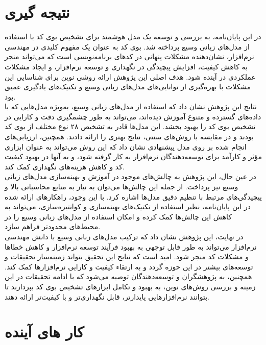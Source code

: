 
\section{نتیجه گیری}
در این پایان‌نامه، به بررسی و توسعه یک مدل هوشمند برای تشخیص بوی کد با استفاده از مدل‌های زبانی وسیع پرداخته شد. بوی کد به عنوان یک مفهوم کلیدی در مهندسی نرم‌افزار، نشان‌دهنده مشکلات پنهانی در کدهای برنامه‌نویسی است که می‌تواند منجر به کاهش کیفیت، افزایش پیچیدگی در نگهداری و توسعه نرم‌افزار، و ایجاد مشکلات عملکردی در آینده شود. هدف اصلی این پژوهش ارائه روشی نوین برای شناسایی این مشکلات با بهره‌گیری از توانایی‌های مدل‌های زبانی وسیع و تکنیک‌های یادگیری عمیق بود.
\\
نتایج این پژوهش نشان داد که استفاده از مدل‌های زبانی وسیع، به‌ویژه مدل‌هایی که با داده‌های گسترده و متنوع آموزش دیده‌اند، می‌تواند به طور چشمگیری دقت و کارایی در تشخیص بوی کد را بهبود بخشد. این مدل‌ها قادر به تشخیص ۲۸ نوع مختلف از بوی کد بودند و در مقایسه با روش‌های سنتی، نتایج بهتری را ارائه دادند. همچنین، ارزیابی‌های انجام شده بر روی مدل پیشنهادی نشان داد که این روش می‌تواند به عنوان ابزاری مؤثر و کارآمد برای توسعه‌دهندگان نرم‌افزار به کار گرفته شود، و به آنها در بهبود کیفیت کد و کاهش هزینه‌های نگهداری کمک کند.
\\
در عین حال، این پژوهش به چالش‌های موجود در آموزش و بهینه‌سازی مدل‌های زبانی وسیع نیز پرداخت. از جمله این چالش‌ها می‌توان به نیاز به منابع محاسباتی بالا و پیچیدگی‌های مرتبط با تنظیم دقیق مدل‌ها اشاره کرد. با این وجود، راهکارهای ارائه شده در این پایان‌نامه، نظیر استفاده از تکنیک‌های بهینه‌سازی و کوانتیزه‌سازی، می‌تواند به کاهش این چالش‌ها کمک کرده و امکان استفاده از مدل‌های زبانی وسیع را در محیط‌های محدودتر فراهم سازد.
\\
در نهایت، این پژوهش نشان داد که ترکیب مدل‌های زبانی وسیع با دانش مهندسی نرم‌افزار می‌تواند به طور قابل توجهی به بهبود فرآیند توسعه نرم‌افزار و کاهش خطاها و مشکلات کد منجر شود. امید است که نتایج این تحقیق بتواند زمینه‌ساز تحقیقات و توسعه‌های بیشتر در این حوزه گردد و به ارتقاء کیفیت و کارایی نرم‌افزارها کمک کند. همچنین، به پژوهشگران و توسعه‌دهندگان توصیه می‌شود که با ادامه تحقیقات در این زمینه و بررسی روش‌های نوین، به بهبود و تکامل ابزارهای تشخیص بوی کد بپردازند تا بتوانند نرم‌افزارهایی پایدارتر، قابل نگهداری‌تر و با کیفیت‌تر ارائه دهند.

\section{کار های آینده}

